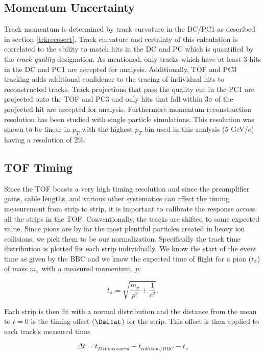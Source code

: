 \subsection{Momentum Uncertainty}
Track momentum is determined by track curvature in the DC/PC1 as described in section \ref{trkrecosect}. Track curvature and certainty of this calculation is correlated to the ability to match hits in the DC and PC which is quantified by the \textit{track quality} designation. As mentioned, only tracks which have at least 3 hits in the DC and PC1 are accepted for analysis. Additionally, TOF and PC3 tracking adds additional confidence to the tracing of individual hits to reconstructed tracks. Track projections that pass the quality cut in the PC1 are projected onto the TOF and PC3 and only hits that fall within $3\sigma$ of the projected hit are accepted for analysis. Furthermore momentum reconstruction resolution has been studied with single particle simulations\citep{Mitchell:2002wu}. This resolution was shown to be linear in $p_T$ with the highest $p_T$ bin used in this analysis (5 GeV/c) having a resolution of 2\%.
 
\subsection{TOF Timing}
Since the TOF boasts a very high timing resolution and since the preamplifier gains, cable lengths, and various other systematics can affect the timing measurement from strip to strip, it is important to calibrate the response across all the strips in the TOF. Conventionally, the tracks are shifted to some expected value. Since pions are by far the most plentiful particles created in heavy ion collisions, we pick them to be our normalization. Specifically the track time distribution is plotted for each strip individually. We know the start of the event time as given by the BBC and we know the expected time of flight for a pion ($t_{\pi}$) of mass $m_{\pi}$ with a measured momentum, $p$:

\begin{equation}
t_{\pi} = \sqrt{\frac{m_{\pi}}{p^2} + \frac{1}{c^2}}.
\end{equation}

Each strip is then fit with a normal distribution and the distance from the mean to $t=0$ is the timing offset ($\Deltat$) for the strip. This offset is then applied to each track's measured time:

\begin{equation}
\Delta t = t_{TOF measured} - t_{collision/BBC} - t_{\pi} 
\end{equation}
 
